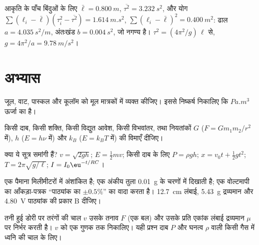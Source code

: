 \begin{example}[ढाल से $g$ पढ़ना]\label{ex:b1:units-dimensions:slope}
आकृति के पाँच बिंदुओं के लिए $\bar\ell = \qty{0.800}{m}$,
$\overline{\tau^2} = \qty{3.232}{s^2}$, और योग
$\sum (\ell_i - \bar\ell)(\tau_i^2 - \overline{\tau^2}) = \qty{1.614}{m.s^2}$,
$\sum (\ell_i - \bar\ell)^2 = \qty{0.400}{m^2}$: ढाल
$a = \qty{4.035}{s^2/m}$, अंतःखंड $b = \qty{0.004}{s^2}$, जो नगण्य है।
$\tau^2 = (4\pi^2/g)\,\ell$ से, $g = 4\pi^2/a = \qty{9.78}{m/s^2}$।
\end{example}

\section{अभ्यास}

\begin{exercise}[$\star$]\label{exo:b1:units-dimensions:1}
जूल, वाट, पास्कल और कूलॉम को मूल मात्रकों में व्यक्त कीजिए। इससे निष्कर्ष
निकालिए कि $\unit{Pa.m^3}$ ऊर्जा का  है।
\end{exercise}

\begin{exercise}[$\star$]\label{exo:b1:units-dimensions:2}
किसी दाब, किसी शक्ति, किसी विद्युत आवेश, किसी विभवांतर, तथा नियतांकों $G$
($F = Gm_1m_2/r^2$ में), $h$ ($E = h\nu$ में) और $k_B$ ($E = k_B T$ में) की
विमाएँ दीजिए।
\end{exercise}

\begin{exercise}[$\star$]\label{exo:b1:units-dimensions:3}
क्या ये सूत्र समांगी हैं? $v = \sqrt{2gh}$;
$E = \tfrac12 m v$; किसी दाब के लिए $P = \rho g h$; $x = v_0 t +
\tfrac12 g t^2$; $T = 2\pi\sqrt{g/\ell}$; $I = I_0 \eu^{-t/RC}$।
\end{exercise}

\begin{exercise}[$\star$]\label{exo:b1:units-dimensions:4}
एक पैमाना मिलीमीटरों में अंशांकित है; एक अंकीय तुला \qty{0.01}{g} के चरणों
में दिखाती है; एक वोल्टमापी का आँकड़ा-पत्रक ``पाठ्यांक का $\pm 0.5\%$'' का
वादा करता है। \qty{12.7}{cm} लंबाई, \qty{5.43}{g} द्रव्यमान और \qty{4.80}{V}
पाठ्यांक की प्रकार B  दीजिए।
\end{exercise}

\begin{exercise}[$\star\star$]\label{exo:b1:units-dimensions:5}
तनी हुई डोरी पर तरंगों की चाल $v$ उसके तनाव $F$ (एक बल) और उसके प्रति एकांक
लंबाई द्रव्यमान $\mu$ पर निर्भर करती है। $v$ को एक  गुणक तक निकालिए।
यही प्रश्न दाब $P$ और घनत्व $\rho$ वाली किसी गैस में ध्वनि की चाल के लिए।
\end{exercise}

